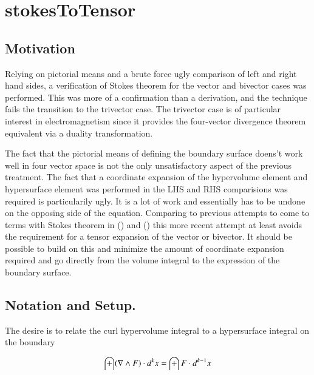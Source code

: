 

\chapter{stokesToTensor}
\label{chap:stokesToTensor}
\date{July 21, 2009}

\beginArtWithToc

\section{Motivation}

Relying on pictorial means and a brute force ugly comparison of left and right hand sides, a verification of Stokes theorem for the vector and bivector cases was performed.  This was more of a confirmation than a derivation, and the technique fails the transition to the trivector case.  The trivector case is of particular interest in electromagnetism since it provides the four-vector divergence theorem equivalent via a duality transformation.

The fact that the pictorial means of defining the boundary surface doens't work well in four vector space is not the only unsatisfactory aspect of the previous treatment.  The fact that a coordinate expansion of the hypervolume element and hypersurface element was performed in the LHS and RHS comparisions was required is particularily ugly.  It is a lot of work and essentially has to be undone on the opposing side of the equation.  Comparing to previous attempts to come to terms with Stokes theorem in (\cite{PJStokes1}) and (\cite{PJStokes2}) this more recent attempt at least avoids the requirement for a tensor expansion of the vector or bivector.  It should be possible to build on this and minimize the amount of coordinate expansion required and go directly from the volume integral to the expression of the boundary surface.

\section{Notation and Setup.}

The desire is to relate the curl hypervolume integral to a hypersurface integral on the boundary

\begin{align}\label{eqn:stokes}
\int (\nabla \wedge F) \cdot d^k x = \int F \cdot d^{k-1} x
\end{align}

